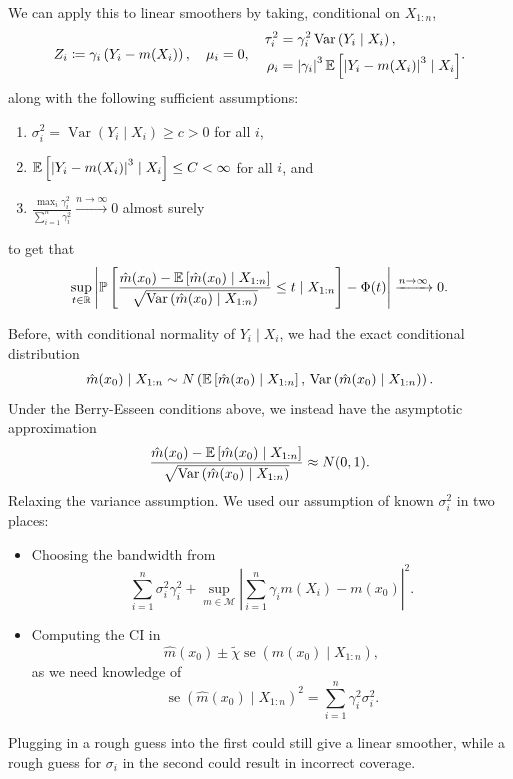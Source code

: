 We can apply this to linear smoothers by taking, conditional on $X_{1:n}$,
\[
	Z_i \coloneqq \gamma_i\left(Y_i - m(X_i)\right),
	\quad \mu_i = 0,
	\quad
	\begin{aligned}
		\tau_i^2 &= \gamma_i^2 \operatorname{Var}\left(Y_i \mid X_i\right), \\
		\rho_i &= \left|\gamma_i\right|^3 \mathbb{E}\left[\left|Y_i-m(X_i)\right|^3 \mid X_i\right]
	\end{aligned}
.\]
along with the following sufficient assumptions:
\begin{enumerate}[label=(\roman*)]
	\item $\sigma_i^2 = \operatorname{Var}\left(Y_i \mid X_i\right) \ge c > 0$ for all $i$,
	\item $\mathbb{E}\left[\left| Y_i - m(X_i) \right|^3 \mid X_i\right]  \le C < \infty$ for all $i$, and 
	\item $\frac{\max_i \gamma_i^2}{\sum_{i=1}^{n} \gamma_i^2} \xrightarrow{n\to \infty}0$ almost surely
\end{enumerate}
to get that \[
	\sup_{t \in \mathbb{R}}\left|\mathbb{P}\left[\frac{\hat{m}(x_0)-\mathbb{E}\left[\hat{m}(x_0) \mid X_{1:n}\right]}{\sqrt{\operatorname{Var}\left(\hat{m}(x_0) \mid X_{1:n}\right)}} \le t \mid X_{1:n}\right]-\Phi(t)\right| \xrightarrow{n\to\infty} 0
.\]
 

Before, with conditional normality of $Y_i \mid X_i$, we had the exact conditional distribution
\[
	\hat{m}(x_0) \mid X_{1:n} \sim N\left(\mathbb{E}\left[\hat{m}(x_0) \mid X_{1:n}\right],\, \operatorname{Var}\left(\hat{m}(x_0) \mid X_{1:n}\right)\right)
.\]
Under the Berry-Esseen conditions above, we instead have the asymptotic approximation
\[
	\frac{\hat{m}(x_0)-\mathbb{E}\left[\hat{m}(x_0) \mid X_{1:n}\right]}{\sqrt{\operatorname{Var}\left(\hat{m}(x_0) \mid X_{1:n}\right)}} \approx N(0,1)
.\]
Relaxing the variance assumption. We used our assumption of known $\sigma_i^2$ in two places:
\begin{itemize}
	\item Choosing the bandwidth from \[
		\sum\limits_{i=1}^{n} \sigma_i^2 \gamma_i^2 + \sup_{m \in \mathscr{M}} \left| \sum\limits_{i=1}^{n} \gamma_i m(X_i) - m(x_0) \right|^2
	.\] 
	\item Computing the CI in \[
		\hat{m}(x_0) \pm \tilde{\chi} \operatorname{se}\left( \hat{m}(x_0) \mid X_{1:n} \right)
	,\] as we need knowledge of \[
		\operatorname{se}\left( \hat{m}(x_0) \mid X_{1:n} \right)^2 = \sum\limits_{i=1}^{n} \gamma_i^2 \sigma_i^2
	.\] 
\end{itemize}
Plugging in a rough guess into the first could still give a linear smoother, while a rough guess for $\sigma_i$ in the second could result in incorrect coverage.

